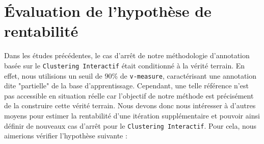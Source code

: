 \section{Évaluation de l'hypothèse de rentabilité}
\label{section:4.5-HYPOTHESE-RENTABILITE}

	Dans les études précédentes, le cas d'arrêt de notre méthodologie d'annotation basée sur le \texttt{Clustering Interactif} était conditionné à la vérité terrain.
	En effet, nous utilisions un seuil de $90$\% de \texttt{v-measure}, caractérisant une annotation dite "partielle" de la base d'apprentissage.
	Cependant, une telle référence n'est pas accessible en situation réelle car l'objectif de notre méthode est précisément de la construire cette vérité terrain.
	Nous devons donc nous intéresser à d'autres moyens pour estimer la rentabilité d'une itération supplémentaire et pouvoir ainsi définir de nouveaux cas d'arrêt pour le \texttt{Clustering Interactif}.
	Pour cela, nous aimerions vérifier l'hypothèse suivante :
	
